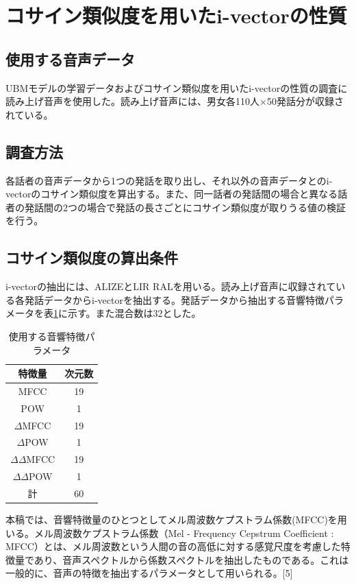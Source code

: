 \section{コサイン類似度を用いたi-vectorの性質}
\label{section:pre_cos}
\subsection{使用する音声データ}
\label{section:detail_ATR}
UBMモデルの学習データおよびコサイン類似度を用いたi-vectorの性質の調査に読み上げ音声\cite{ATR}を使用した。読み上げ音声には、男女各110人×50発話分が収録されている。

\subsection{調査方法}
各話者の音声データから1つの発話を取り出し、それ以外の音声データとのi-vectorのコサイン類似度を算出する。また、同一話者の発話間の場合と異なる話者の発話間の2つの場合で発話の長さごとにコサイン類似度が取りうる値の検証を行う。\par

\subsection{コサイン類似度の算出条件}
i-vectorの抽出には、ALIZEとLIR RALを用いる。読み上げ音声に収録されている各発話データからi-vectorを抽出する。発話データから抽出する音響特徴パラメータを表\ref{iv_feature}に示す。また混合数は32とした。

\begin{table}[H]
  \begin{center}
    \caption{使用する音響特徴パラメータ}
    \label{iv_feature}
    \begin{tabular}{|c||c|} \hline
      特徴量 & 次元数\\ \hline
      MFCC & 19  \\ 
      POW & 1  \\ 
      $\Delta$MFCC & 19 \\ 
      $\Delta$POW & 1 \\ 
      $\Delta\Delta$MFCC & 19 \\ 
      $\Delta\Delta$POW & 1 \\ \hline
      計 & 60 \\ \hline
    \end{tabular}
  \end{center}
\end{table}

本稿では、音響特徴量のひとつとしてメル周波数ケプストラム係数(MFCC)を用いる。メル周波数ケプストラム係数（Mel - Frequency Cepstrum Coefficient : MFCC）とは、メル周波数という人間の音の高低に対する感覚尺度を考慮した特徴量であり、音声スペクトルから係数スペクトルを抽出したものである。これは一般的に、音声の特徴を抽出するパラメータとして用いられる。[5]

